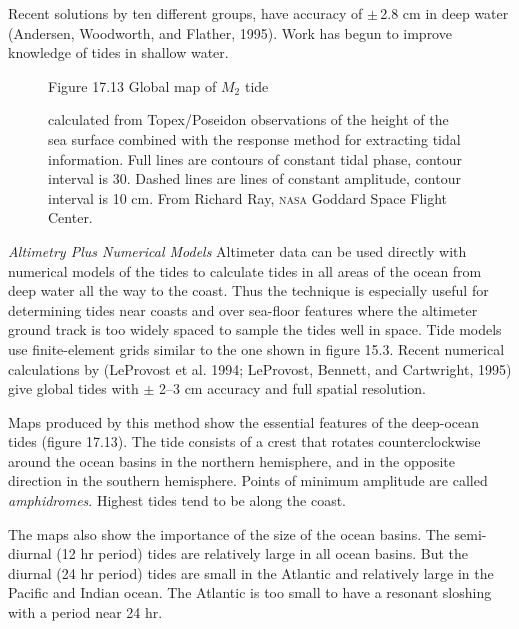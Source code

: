 Recent solutions by ten different groups, have accuracy of $\pm \,
$2.8 cm in deep water (Andersen, Woodworth, and Flather, 1995). Work has begun to
improve knowledge of tides in shallow water.

\begin{figure}[t!]
\footnotesize
Figure 17.13 Global map of $M_2$ tide \rule{0mm}{4ex}calculated from
Topex/Poseidon observations of the height of the sea surface
combined with the response method for extracting tidal information.  Full lines are contours of
constant tidal phase, contour interval is 30\degrees. Dashed lines are lines of constant
amplitude, contour interval is 10 cm. From Richard Ray, \textsc{nasa} Goddard Space Flight
Center.
\label{fig:m2_tide}
\vspace{-3ex}
\end{figure}

\textit{Altimetry Plus Numerical Models} Altimeter data can be used directly with
numerical models of the tides to calculate tides in all areas of the ocean from deep water all
the way to the coast. Thus the technique is especially useful for determining tides near
coasts and over sea-floor features where the altimeter ground track is too widely spaced to
sample the tides well in space. Tide models use finite-element grids similar to the one shown
in figure 15.3. Recent numerical calculations by (LeProvost et al. 1994; LeProvost, Bennett,
and Cartwright, 1995) give global tides with
$\pm$ 2--3 cm accuracy and full spatial resolution.

Maps produced by this method show the essential features of the deep-ocean tides (figure 17.13). The tide consists of a crest that rotates counterclockwise around the ocean basins in the northern hemisphere, and in the opposite direction in the southern
hemisphere. Points of minimum amplitude are called \textit{amphidromes}. Highest tides tend to be along the coast.

The maps also show the importance of the size of the ocean basins. The semi-diurnal (12 hr period) tides are relatively large in all ocean basins. But the diurnal (24 hr period) tides are small in the Atlantic and relatively
large in the Pacific and Indian ocean. The Atlantic is too small to have a resonant sloshing with a period near 24 hr.

